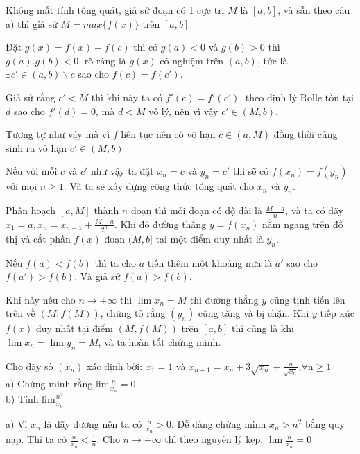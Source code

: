 \documentclass[11pt]{scrartcl}
\begin{document}
\begin{itemize}[label=, leftmargin=0em, itemsep=0.5em]
\begin{sol}
        
        Không mất tính tổng quát, giả sử đoạn có 1 cực trị $M$ là $[a,b]$, và sẵn theo câu a) thì giả sử $M = max\{f(x)\}$ trên $[a,b]$
        
        
        Đặt $g(x) = f(x) - f(c)$ thì có $g(a) < 0$ và $ g(b) > 0$ thì $g(a).g(b) < 0$, rõ ràng là $g(x)$ có nghiệm trên $(a,b)$, tức là $\exists c' \in (a,b)\backslash{c}$ sao cho $f(c) = f(c')$. 


        Giả sử rằng $c' < M$ thì khi này ta có $f'(c) = f'(c')$, theo định lý Rolle tồn tại $d$ sao cho $f'(d) = 0$, mà $d < M$ vô lý, nên vì vậy $c' \in (M,b)$. 
        
        
        Tương tự như vậy mà vì $f$ liên tục nên có vô hạn $c \in (a,M)$ đồng thời cũng sinh ra vô hạn $c' \in (M,b)$


        Nếu với mỗi $c$ và $c'$ như vậy ta đặt $x_n = c$ và $y_n = c'$ thì sẽ có $f(x_n) = f(y_n)$ với mọi $n \geq 1$. Và ta sẽ xây dựng công thức tổng quát cho $x_n$ và $y_n$.


        Phân hoạch $[a,M]$ thành $n$ đoạn thì mỗi đoạn có độ dài là $\frac{M - a}{n}$,  và ta có dãy $x_1 = a, x_n = x_{n - 1}+ \frac{M - a}{2^n} $. Khi đó đường thẳng $y = f(x_n)$ nằm ngang trên đồ thị và cắt phần $f(x)$ đoạn $(M,b]$ tại một điểm duy nhất là $y_n$.
        
        Nếu $f(a) < f(b)$ thì ta cho $a$ tiến thêm một khoảng nữa là $a'$ sao cho $f(a') > f(b)$. Và giả sử $f(a) > f(b)$.


        Khi này nếu cho $n \to +\infty$ thì $\lim x_n = M$ thì đường thẳng $y$ cũng tịnh tiến lên trên về $(M,f(M))$, chứng tỏ rằng $(y_n)$ cũng tăng và bị chặn. Khi $y$ tiếp xúc $f(x)$ duy nhất tại điểm $(M,f(M))$ trên $[a,b]$ thì cũng là khi $\lim x_n = \lim y_n = M$, và ta hoàn tất chứng minh.
    \end{sol}
    \begin{bt}
        Cho dãy số $(x_n)$ xác định bởi: $x_1=1$ và $x_{n+1}=x_n+3\sqrt{x_n} + \frac{n}{\sqrt{x_n}}$,$\forall$n$\ge1$\\
a) Chứng minh rằng lim$\frac{n}{x_n}=0$\\ 
b) Tính lim$\frac{n^2}{x_n}$
    \end{bt}


    \begin{sol}
        a) Vì $x_n$ là dãy dương nên ta có $\frac{n}{x_n} > 0$. Dễ dàng chứng minh $x_n > n^2$ bằng quy nạp. Thì ta có $\frac{n}{x_n} < \frac{1}{n}$. Cho $n \to +\infty$ thì theo nguyên lý kẹp, $\lim\frac{n}{x_n} = 0$ 



\end{sol}
\end{itemize}
\end{document}

